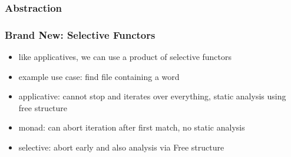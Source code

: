\documentclass[aspectratio=169]{beamer}
\begin{document}
\begin{frame}
  \frametitle{Abstraction}
\end{frame}

\begin{frame}
  \frametitle{Brand New: Selective Functors}
  \begin{itemize}
  \item like applicatives, we can use a product of selective functors
  \item example use case: find file containing a word
  \item applicative: cannot stop and iterates over everything, static analysis using free structure
  \item monad: can abort iteration after first match, no static analysis
  \item selective: abort early and also analysis via Free structure
  \end{itemize}
\end{frame}
\end{document}
